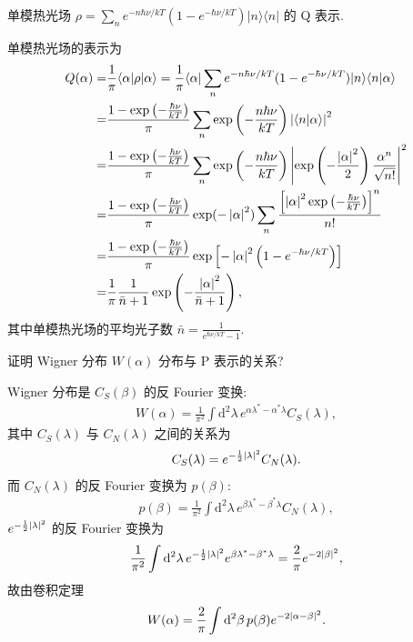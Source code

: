 \documentclass{assignment}
\begin{document}
\begin{prob}
    单模热光场 $\rho=\sum_ne^{-n\hbar\nu/kT}(1-e^{-\hbar\nu/kT})\lvert n\rangle\langle n\rvert$ 的 Q 表示.
\end{prob}
\begin{sol}
    单模热光场的表示为
    \begin{align}
        \notag Q(\alpha)=&\frac{1}{\pi}\langle\alpha\rvert\rho\lvert\alpha\rangle=\frac{1}{\pi}\langle\alpha\rvert\sum_ne^{-n\hbar\nu/kT}(1-e^{-\hbar\nu/kT})\lvert n\rangle\langle n\vert\alpha\rangle\\
        \notag=&\frac{1-\exp\left(-\frac{\hbar\nu}{kT}\right)}{\pi}\sum_n\exp\left(-\frac{n\hbar\nu}{kT}\right)\left\lvert\langle n\vert\alpha\rangle\right\rvert^2\\
        \notag=&\frac{1-\exp\left(-\frac{\hbar\nu}{kT}\right)}{\pi}\sum_n\exp\left(-\frac{n\hbar\nu}{kT}\right)\left\lvert\exp\left(-\frac{\left\lvert\alpha\right\rvert^2}{2}\right)\frac{\alpha^n}{\sqrt{n!}}\right\rvert^2\\
        \notag=&\frac{1-\exp\left(-\frac{\hbar\nu}{kT}\right)}{\pi}\exp(-\left\lvert\alpha\right\rvert^2)\sum_n\frac{\left[\left\lvert\alpha\right\rvert^2\exp\left(-\frac{\hbar\nu}{kT}\right)\right]^n}{n!}\\
        \notag=&\frac{1-\exp\left(-\frac{\hbar\nu}{kT}\right)}{\pi}\exp\left[-\left\lvert\alpha\right\rvert^2\left(1-e^{-\hbar\nu/kT}\right)\right]\\
        =&\frac{1}{\pi}\frac{1}{\bar{n}+1}\exp\left(-\frac{\left\lvert\alpha\right\rvert^2}{\bar{n}+1}\right),
    \end{align}
    其中单模热光场的平均光子数 $\bar{n}=\frac{1}{e^{\hbar\nu/kT}-1}$.
\end{sol}

\begin{prob}
    证明 Wigner 分布 $W(\alpha)$ 分布与 P 表示的关系?
\end{prob}
\begin{pf}
    Wigner 分布是 $C_S(\beta)$ 的反 Fourier 变换:
    \begin{align}
        W(\alpha)=\frac{1}{\pi^2}\int\mathrm{d}^2\lambda\,e^{\alpha\lambda^*-\alpha^*\lambda}C_S(\lambda),
    \end{align}
    其中 $C_S(\lambda)$ 与 $C_N(\lambda)$ 之间的关系为
    \begin{align}
        C_S(\lambda)=e^{-\frac{1}{2}\left\lvert\lambda\right\rvert^2}C_N(\lambda).
    \end{align}
    而 $C_N(\lambda)$ 的反 Fourier 变换为 $p(\beta)$:
    \begin{align}
        p(\beta)=\frac{1}{\pi^2}\int\mathrm{d}^2\lambda\,e^{\beta\lambda^*-\beta^*\lambda}C_N(\lambda),
    \end{align}
    $e^{-\frac{1}{2}\left\lvert\lambda\right\rvert^2}$ 的反 Fourier 变换为
    \begin{align}
        \frac{1}{\pi^2}\int\mathrm{d}^2\lambda\,e^{-\frac{1}{2}\left\lvert\lambda\right\rvert^2}e^{\beta\lambda^*-\beta^*\lambda}=\frac{2}{\pi}e^{-2\left\lvert\beta\right\rvert^2},
    \end{align}
    故由卷积定理
    \begin{align}
        W(\alpha)=\frac{2}{\pi}\int\mathrm{d}^2\beta\,p(\beta)e^{-2\left\lvert\alpha-\beta\right\rvert^2}.
    \end{align}
\end{pf}
\end{document}
